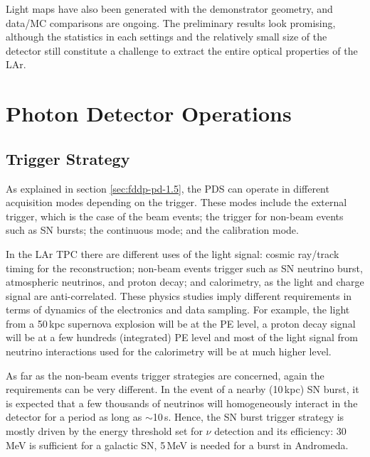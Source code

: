 Light maps have also been generated with the demonstrator geometry, and data/MC comparisons are ongoing. The preliminary results look promising, although the statistics in each settings and the relatively small size of the detector still constitute a challenge to extract the entire optical properties of the LAr.

\section{Photon Detector Operations}
\label{sec:fddp-pd-7}


\subsection{Trigger Strategy}
\label{sec:fddp-pd-7.2}

As explained in section \ref{sec:fddp-pd-1.5}, the PDS can operate in different acquisition modes depending on the trigger. These modes include the external trigger, which is the case of the beam events; the trigger for non-beam events such as SN bursts; the continuous mode; and the calibration mode. 

In the LAr TPC there are different uses of the light signal: cosmic ray/track timing for the reconstruction; non-beam events trigger such as SN neutrino burst, atmospheric neutrinos, and proton decay; and calorimetry, as the light and charge signal are anti-correlated. These physics studies imply different requirements in terms of dynamics of the electronics and data sampling. For example, the light from a 50\,kpc supernova explosion will be at the PE level, a proton decay signal will be at a few hundreds (integrated) PE level and most of the light signal from neutrino interactions used for the calorimetry will be at much higher level. 

As far as the non-beam events trigger strategies are concerned, again the requirements can be very different. In the event of a nearby (10\,kpc) SN burst, it is expected that a few thousands of neutrinos will homogeneously interact in the detector for a period as long as $\sim$10\,s. Hence, the SN burst trigger strategy is mostly driven by the energy threshold set for $\nu$ detection and its efficiency: 30\,MeV is sufficient for a galactic SN, 5\,MeV is needed for a burst in Andromeda. %

